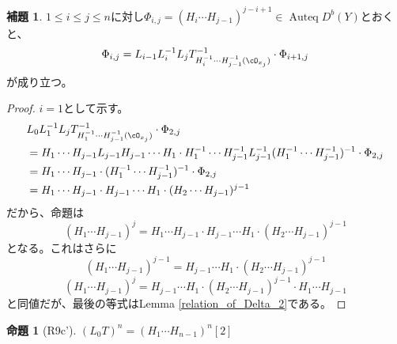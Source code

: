 \documentclass[uplatex, a4paper, dvipdfmx]{jsarticle}
\theoremstyle{definition}
\newtheorem{proposition}[theorem]{命題}
\newtheorem{lemma}[theorem]{補題}
\DeclareMathOperator{\Auteq}{\mathrm{Auteq}}
\begin{document}
\begin{lemma}\label{recurrence_formula_for_Phi}
    $1\leq i \leq j \leq n$に対し$\Phi_{i,j} = (H_i \cdots H_{j-1})^{j-i+1}\in \Auteq D^b(Y)$とおくと、
    \begin{equation}
        \Phi_{i, j} = L_{i-1}L_i^{-1}L_j T_{H_i^{-1}\cdots H_{j-1}^{-1}(\cO_{x_j})}^{-1} \cdot \Phi_{i+1, j}
    \end{equation}
    が成り立つ。
\end{lemma}
\begin{proof}
    $i=1$として示す。
    \begin{align}
         & L_{0}L_1^{-1}L_j T_{H_1^{-1}\cdots H_{j-1}^{-1}(\cO_{x_j})}^{-1} \cdot \Phi_{2, j}                                                             \\
         & =H_1 \cdots H_{j-1}L_{j-1}H_{j-1}\cdots H_1 \cdot H_1^{-1}\cdots H_{j-1}^{-1} L_{j-1}^{-1}(H_1^{-1}\cdots H_{j-1}^{-1})^{-1} \cdot \Phi_{2, j} \\
         & =H_1 \cdots H_{j-1} \cdot(H_1^{-1}\cdots H_{j-1}^{-1})^{-1} \cdot \Phi_{2, j}                                                                  \\
         & =H_1 \cdots H_{j-1} \cdot H_{j-1}\cdots H_1 \cdot (H_2 \cdots H_{j-1})^{j-1}
    \end{align}
    だから、命題は
    \begin{equation}
        (H_1 \cdots H_{j-1})^j=H_1 \cdots H_{j-1} \cdot H_{j-1}\cdots H_1 \cdot (H_2 \cdots H_{j-1})^{j-1}
    \end{equation}
    となる。これはさらに
    \begin{equation}
        (H_1 \cdots H_{j-1})^{j-1}=H_{j-1}\cdots H_1 \cdot (H_2 \cdots H_{j-1})^{j-1}
    \end{equation}
    \begin{equation}
        (H_1 \cdots H_{j-1})^j=H_{j-1}\cdots H_1 \cdot (H_2 \cdots H_{j-1})^{j-1}\cdot H_1 \cdots H_{j-1}
    \end{equation}
    と同値だが、最後の等式はLemma \ref{relation_of_Delta_2}である。
\end{proof}
\begin{proposition}[R9c']
    $(L_0T)^n = (H_1\cdots H_{n-1})^n[2]$
\end{proposition}
\end{document}
